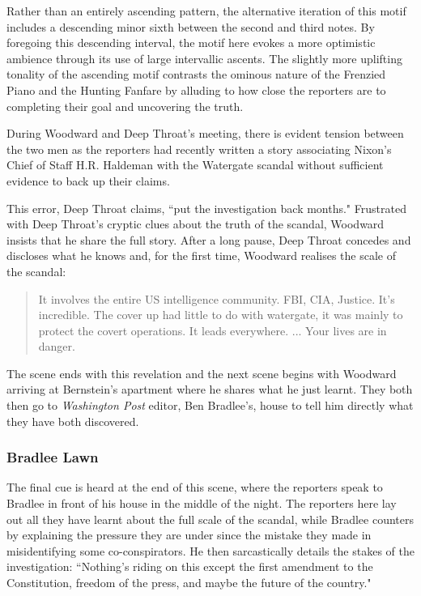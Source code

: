 Rather than an entirely ascending pattern, the alternative iteration of this motif includes a descending minor sixth between the second and third notes.
By foregoing this descending interval, the motif here evokes a more optimistic ambience through its use of large intervallic ascents.
The slightly more uplifting tonality of the ascending motif contrasts the ominous nature of the Frenzied Piano and the Hunting Fanfare by alluding to how close the reporters are to completing their goal and uncovering the truth.

During Woodward and Deep Throat's meeting, there is evident tension between the two men as the reporters had recently written a story associating Nixon's Chief of Staff H.R. Haldeman with the Watergate scandal 
without sufficient evidence to back up their claims.


This error, Deep Throat claims, ``put the investigation back months."
Frustrated with Deep Throat's cryptic clues about the truth of the scandal, Woodward insists that he share the full story.
After a long pause, Deep Throat concedes and discloses what he knows and, for the first time, Woodward realises the scale of the scandal:
\begin{quote}
It involves the entire US intelligence community. FBI, CIA, Justice. It's incredible. The cover up had little to do with watergate, it was mainly to protect the covert operations. It leads everywhere. ... Your lives are in danger.
\end{quote}
The scene ends with this revelation and the next scene begins with Woodward arriving at Bernstein's apartment where he shares what he just learnt.
They both then go to \textit{Washington Post} editor, Ben Bradlee's, house to tell him directly what they have both discovered.

\subsubsection{Bradlee Lawn}

The final cue is heard at the end of this scene, where the reporters speak to Bradlee in front of his house in the middle of the night.
The reporters here lay out all they have learnt about the full scale of the scandal, while Bradlee counters by explaining the pressure they are under since the mistake they made in misidentifying some co-conspirators.
He then sarcastically details the stakes of the investigation:
``Nothing's riding on this except the first amendment to the Constitution, freedom of the press, and maybe the future of the country."\autocites[The first amendment of the USA's Constitution declares that ``Congress shall make no law respecting an establishment of religion, or prohibiting the free exercise thereof; or abridging the freedom of speech, or of the press; or the right of the people peaceably to assemble, and to petition the Government for a redress of grievances."][]{noauthor_constitution_nodate}

